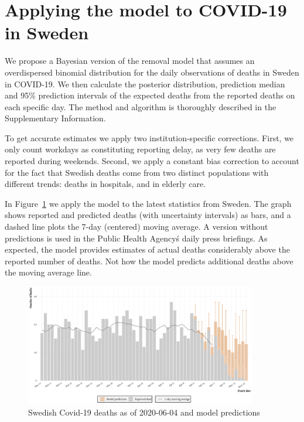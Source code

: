 \documentclass[a4paper,11pth]{article}
\begin{document}
\section{Applying the model to COVID-19 in Sweden}
We propose a Bayesian version of the removal model that assumes an overdispersed binomial distribution for the daily observations of deaths in Sweden in COVID-19. We then calculate the posterior distribution, prediction median and 95\% prediction intervals of the expected deaths from the reported deaths on each specific day. The method and algorithm is thoroughly described in the Supplementary Information.

To get accurate estimates we apply two institution-specific corrections. First, we only count workdays as constituting reporting delay, as very few deaths are reported during weekends. Second, we apply a constant bias correction to account for the fact that Swedish deaths come from two distinct populations with different trends: deaths in hospitals, and in elderly care.

In Figure~\ref{fig:latest_prediction} we apply the model to the latest statistics from Sweden. The graph shows reported and predicted deaths (with uncertainty intervals) as bars, and a dashed line plots the 7-day (centered) moving average. A version without predictions is used in the Public Health Agency\'s daily press briefings. As expected, the model provides estimates of actual deaths considerably above the reported number of deaths. Not how the model predicts additional deaths above the moving average line.

\begin{figure}
    \centering
    \includegraphics[width=0.9\textwidth]{plots/latest_prediction_SWE}
    \caption{Swedish Covid-19 deaths as of 2020-06-04 and model predictions}
    \label{fig:latest_prediction}
\end{figure}
\end{document}
